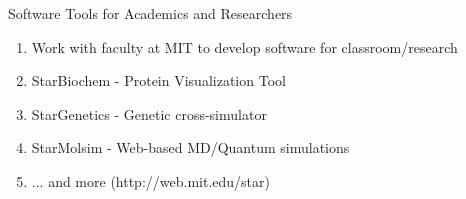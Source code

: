 \begin{frame}{Software Tools for Academics and Researchers}
\begin{enumerate}
	\item Work with faculty at MIT to develop software for classroom/research
	\item StarBiochem - Protein Visualization Tool
	\item StarGenetics - Genetic cross-simulator
	\item StarMolsim - Web-based MD/Quantum simulations
	\item ... and more (http://web.mit.edu/star)
\end{enumerate}
\end{frame}
